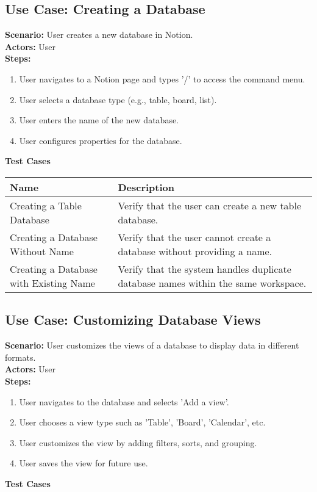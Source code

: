 \documentclass{article}
\begin{document}
\subsection{\textbf{Use Case: Creating a Database}}
\textbf{Scenario:} User creates a new database in Notion.\\
\textbf{Actors:} User\\
\textbf{Steps:}
\begin{enumerate}
\item User navigates to a Notion page and types '/' to access the command menu.
\item User selects a database type (e.g., table, board, list).
\item User enters the name of the new database.
\item User configures properties for the database.
\end{enumerate}
\textbf{Test Cases}

            \begin{longtable}{|p{}|p{}|}
            \hline
            \textbf{Name} & \textbf{Description} \\
            \hline
            Creating a Table Database & Verify that the user can create a new table database. \\
\hline
Creating a Database Without Name & Verify that the user cannot create a database without providing a name. \\
\hline
Creating a Database with Existing Name & Verify that the system handles duplicate database names within the same workspace. \\
\hline
\end{longtable}\subsection{\textbf{Use Case: Customizing Database Views}}
\textbf{Scenario:} User customizes the views of a database to display data in different formats.\\
\textbf{Actors:} User\\
\textbf{Steps:}
\begin{enumerate}
\item User navigates to the database and selects 'Add a view'.
\item User chooses a view type such as 'Table', 'Board', 'Calendar', etc.
\item User customizes the view by adding filters, sorts, and grouping.
\item User saves the view for future use.
\end{enumerate}
\textbf{Test Cases}
\end{document}
